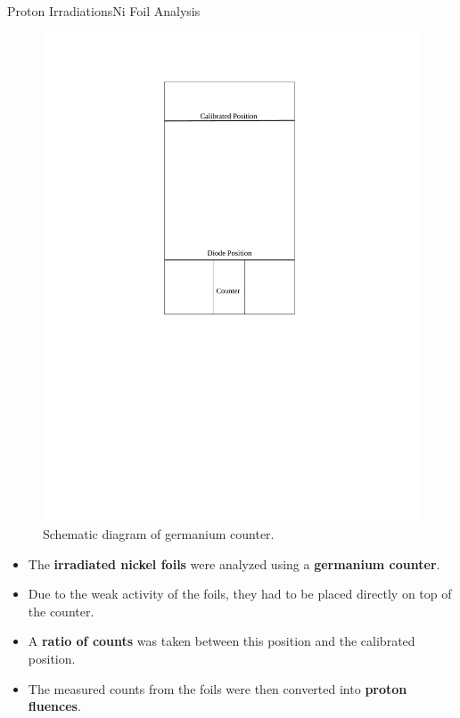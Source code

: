 \documentclass{beamer}
\begin{document}
    \begin{frame}{Proton Irradiations}{Ni Foil Analysis}
        \begin{minipage}{0.45\linewidth}
            \begin{figure}
                \centering
                \includegraphics[width = 0.9\linewidth, trim = {6.5cm 11.5cm 5.5cm 2cm}, clip = true]{Counter.pdf}
                \caption{\footnotesize Schematic diagram of germanium counter.}
            \end{figure}
        \end{minipage}%
        \begin{minipage}{0.55\linewidth}
            \begin{itemize}
                \item The \textbf{irradiated nickel foils} were analyzed using a \textbf{germanium counter}.
                \item Due to the weak activity of the foils, they had to be placed directly on top of the counter.
                \item A \textbf{ratio of counts} was taken between this position and the calibrated position.
                \item The measured counts from the foils were then converted into \textbf{proton fluences}.
            \end{itemize}
        \end{minipage}%
    \end{frame}
\end{document}
